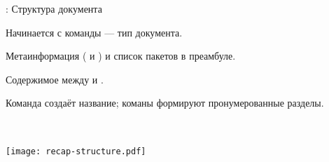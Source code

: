 \documentclass[usenames,dvipsnames]{beamer}
\begin{document}
\begin{frame}[fragile]{\insertsection: Структура документа}
\vspace{-3ex}
\begin{itemize}{\small
\item Начинается с команды  --- тип документа.
\item Метаинформация ( и ) и список пакетов в преамбуле.
\item Содержимое между  и .
\item Команда  создаёт название; команы 
формируют пронумерованные разделы.
}\end{itemize}
\vspace{-4ex}
\begin{minipage}{0.55\linewidth}
\end{minipage}~~%
\begin{minipage}{0.45\linewidth}
\texttt{[image: recap-structure.pdf]}
\end{minipage}
\end{frame}
\end{document}
